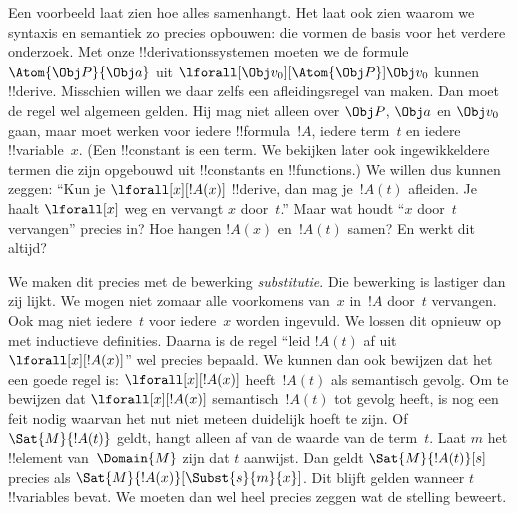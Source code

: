 \documentclass[../../../include/open-logic-section]{subfiles}
\begin{document}


Een voorbeeld laat zien hoe alles samenhangt. Het laat ook zien waarom
we syntaxis en semantiek zo precies opbouwen: die vormen de basis voor
het verdere onderzoek. Met onze !!{derivation}ssystemen moeten we de
formule $\Atom{\Obj P}{\Obj a}$ uit
$\lforall[\Obj v_0][\Atom{\Obj P}]{\Obj v_0}$ kunnen !!{derive}. Misschien willen we daar zelfs een
afleidingsregel van maken. Dan moet de regel wel algemeen gelden. Hij
mag niet alleen over $\Obj P$, $\Obj a$ en $\Obj v_0$ gaan, maar moet
werken voor iedere !!{formula}~$!A$, iedere term~$t$ en iedere
!!{variable}~$x$. (Een !!{constant} is een term. We bekijken later ook
ingewikkeldere termen die zijn opgebouwd uit !!{constant}s en
!!{function}s.) We willen dus kunnen zeggen: ``Kun je
$\lforall[x][!A(x)]$ !!{derive}, dan mag je~$!A(t)$ afleiden. Je haalt
$\lforall[x]$ weg en vervangt $x$ door~$t$.'' Maar wat houdt
``$x$ door~$t$ vervangen'' precies in? Hoe hangen $!A(x)$ en~$!A(t)$
samen? En werkt dit altijd?

We maken dit precies met de bewerking \emph{substitutie}. Die bewerking
is lastiger dan zij lijkt. We mogen niet zomaar alle voorkomens van~$x$
in~$!A$ door~$t$ vervangen. Ook mag niet iedere~$t$ voor iedere~$x$
worden ingevuld. We lossen dit opnieuw op met inductieve definities.
Daarna is de regel ``leid $!A(t)$ af uit $\lforall[x][!A(x)]$'' wel
precies bepaald. We kunnen dan ook bewijzen dat het een goede regel is:
$\lforall[x][!A(x)]$ heeft~$!A(t)$ als semantisch gevolg.
Om te bewijzen dat $\lforall[x][!A(x)]$ semantisch~$!A(t)$ tot gevolg
heeft, is nog een feit nodig waarvan het nut niet meteen duidelijk
hoeft te zijn. Of $\Sat{M}{!A(t)}$ geldt, hangt alleen af van
de waarde van de term~$t$. Laat $m$ het !!{element} van~$\Domain{M}$
zijn dat $t$ aanwijst. Dan geldt $\Sat{M}{!A(t)}[s]$ precies als
$\Sat{M}{!A(x)}[\Subst{s}{m}{x}]$. Dit blijft gelden wanneer $t$
!!{variable}s bevat. We moeten dan wel heel precies zeggen wat de
stelling beweert.
\end{document}
